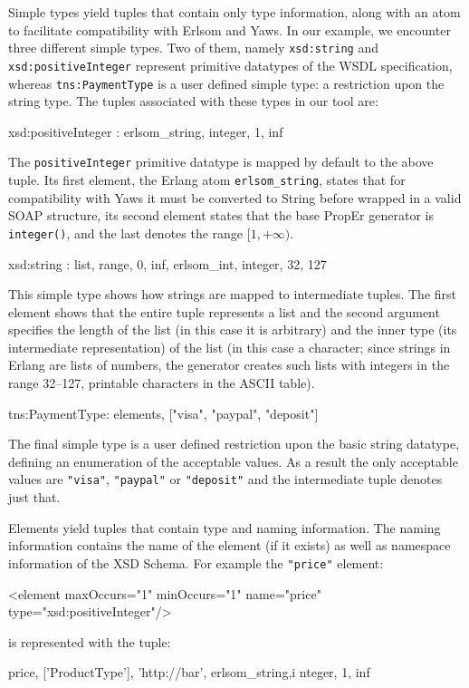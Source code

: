 \documentclass[submission,copyright]{eptcs}
\begin{document}
Simple types yield tuples that contain only type information, along
with an atom to facilitate compatibility with Erlsom and Yaws. In our
example, we encounter three different simple types. Two of them,
namely \texttt{xsd:string} and \texttt{xsd:positiveInteger} represent
primitive datatypes of the WSDL specification, whereas
\texttt{tns:PaymentType} is a user defined simple type: a restriction
upon the string type. The tuples associated with these types in our
tool are:
\begin{lstline}
xsd:positiveInteger : {erlsom_string, integer, {1, inf}}
\end{lstline}
The \texttt{positiveInteger} primitive datatype is mapped by default to the
above tuple.  Its first element, the Erlang atom \texttt{erlsom\_string}, states
that for compatibility with Yaws it must be converted to String before wrapped
in a valid SOAP structure, its second element states that the base PropEr
generator is \texttt{integer()}, and the last denotes the range $[1,+\infty)$. 
\begin{lstline}
xsd:string : {list, {{range, 0, inf}, {erlsom_int, integer, {32, 127}}}}
\end{lstline}
This simple type shows how strings are mapped to intermediate tuples.
The first element shows that the entire tuple represents a list and
the second argument specifies the length of the list (in this case it
is arbitrary) and the inner type (its intermediate representation) of
the list (in this case a character; since strings in Erlang are lists
of numbers, the generator creates such lists with integers in the
range 32--127, printable characters in the ASCII table).

\begin{lstline}
tns:PaymentType: {elements, ["visa", "paypal", "deposit"]}
\end{lstline}
The final simple type is a user defined restriction upon the basic
string datatype, defining an enumeration of the acceptable values. As
a result the only acceptable values are \texttt{"visa"},
\texttt{"paypal"} or \texttt{"deposit"} and the intermediate tuple
denotes just that.

Elements yield tuples that contain type and naming information. The
naming information contains the name of the element (if it exists) as
well as namespace information of the XSD Schema. For example the
\texttt{"price"} element:
\begin{lstline}
<element maxOccurs="1" minOccurs="1" name="price" type="xsd:positiveInteger"/>
\end{lstline}
is represented with the tuple:
\begin{lstline}
{{price, ['ProductType'], 'http://bar'}, {erlsom_string,i nteger, {1, inf}}}
\end{lstline}
\end{document}
